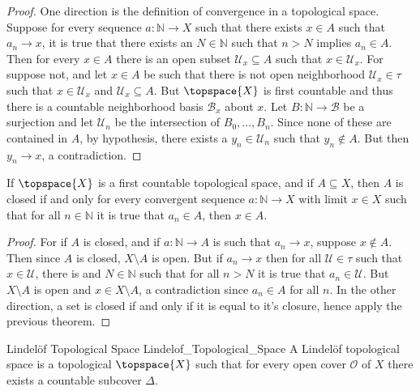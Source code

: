     \begin{proof}
        One direction is the definition of convergence in a topological
        space. Suppose for every sequence $a:\mathbb{N}\rightarrow{X}$ such
        that there exists $x\in{A}$ such that $a_{n}\rightarrow{x}$, it is
        true that there exists an $N\in\mathbb{N}$ such that $n>N$ implies
        $a_{n}\in{A}$. Then for every $x\in{A}$ there is an open subset
        $\mathcal{U}_{x}\subseteq{A}$ such that $x\in\mathcal{U}_{x}$. For
        suppose not, and let $x\in{A}$ be such that there is not open
        neighborhood $\mathcal{U}_{x}\in\tau$ such that
        $x\in\mathcal{U}_{x}$ and $\mathcal{U}_{x}\subseteq{A}$. But
        $\topspace{X}$ is first countable and thus there is a countable
        neighborhood basis $\mathcal{B}_{x}$ about $x$. Let
        $B:\mathbb{N}\rightarrow\mathcal{B}$ be a surjection and let
        $\mathcal{U}_{n}$ be the intersection of $B_{0},\dots,B_{n}$. Since
        none of these are contained in $A$, by hypothesis, there exists a
        $y_{n}\in\mathcal{U}_{n}$ such that $y_{n}\notin{A}$. But then
        $y_{n}\rightarrow{x}$, a contradiction.
    \end{proof}
    \begin{theorem}
        If $\topspace{X}$ is a first countable topological space, and if
        $A\subseteq{X}$, then $A$ is closed if and only for every convergent
        sequence $a:\mathbb{N}\rightarrow{X}$ with limit $x\in{X}$ such that
        for all $n\in\mathbb{N}$ it is true that $a_{n}\in{A}$, then
        $x\in{A}$.
    \end{theorem}
    \begin{proof}
        For if $A$ is closed, and if $a:\mathbb{N}\rightarrow{A}$ is such
        that $a_{n}\rightarrow{x}$, suppose $x\notin{A}$. Then since $A$ is
        closed, $X\setminus{A}$ is open. But if $a_{n}\rightarrow{x}$ then
        for all $\mathcal{U}\in\tau$ such that $x\in\mathcal{U}$, there is
        and $N\in\mathbb{N}$ such that for all $n>N$ it is true that
        $a_{n}\in\mathcal{U}$. But $X\setminus{A}$ is open and
        $x\in{X}\setminus{A}$, a contradiction since $a_{n}\in{A}$ for all
        $n$. In the other direction, a set is closed if and only if it is
        equal to it's closure, hence apply the previous theorem.
    \end{proof}
    \begin{fdefinition}{Lindel\"{o}f Topological Space}
                       {Lindelof_Topological_Space}
        A Lindel\"{o}f topological space is a topological $\topspace{X}$
        such that for every open cover $\mathcal{O}$ of $X$ there exists a
        countable subcover $\Delta$.
    \end{fdefinition}
